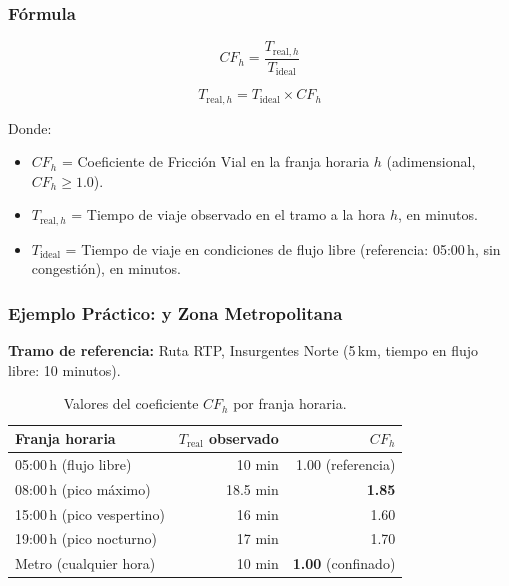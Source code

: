 \subsubsection{Fórmula}
 
\begin{equation}
    CF_h = \frac{T_{\text{real},h}}{T_{\text{ideal}}}
    \label{eq:friccion-vial}
\end{equation}
 
\begin{equation}
    T_{\text{real},h} = T_{\text{ideal}} \times CF_h
    \label{eq:tiempo-real}
\end{equation}
 
Donde:
\begin{itemize}
    \item $CF_h$ = Coeficiente de Fricción Vial en la franja horaria $h$
    (adimensional, $CF_h \geq 1.0$).
\item $T_{\text{real},h}$ = Tiempo de viaje observado en el tramo a la hora $h$,
    en minutos.
    \item $T_{\text{ideal}}$ = Tiempo de viaje en condiciones de flujo libre
    (referencia: 05:00\,h, sin congestión), en minutos.
\end{itemize}
 
\subsubsection{Ejemplo Práctico: \cdmx{} y Zona Metropolitana}
 
\textbf{Tramo de referencia:} Ruta RTP, Insurgentes Norte (5\,km, tiempo en
flujo
libre: 10 minutos).
 
\begin{table}[H]
    \centering
    \caption{Valores del coeficiente $CF_h$ por franja horaria.}
    \label{tab:friccion-vial}
    \begin{tabularx}{\textwidth}{X r r}
        \toprule
        \textbf{Franja horaria} & \textbf{$T_{\text{real}}$ observado} &
        \textbf{$CF_h$} \\
        \midrule
        05:00\,h (flujo libre)          & 10 min   & 1.00 (referencia) \\
        08:00\,h (pico máximo)          & 18.5 min & \textbf{1.85} \\
        15:00\,h (pico vespertino)      & 16 min   & 1.60 \\
        19:00\,h (pico nocturno)        & 17 min   & 1.70 \\
        Metro (cualquier hora)          & 10 min   & \textbf{1.00} (confinado) \\
        \bottomrule
    \end{tabularx}
\end{table}


